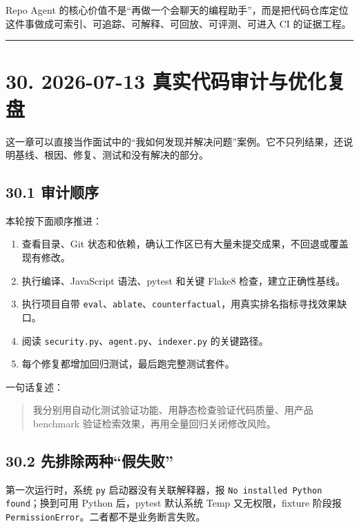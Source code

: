 \documentclass[UTF8,12pt,openany]{ctexbook}
\begin{document}
Repo Agent 的核心价值不是“再做一个会聊天的编程助手”，而是把代码仓库定位这件事做成可索引、可追踪、可解释、可回放、可评测、可进入 CI 的证据工程。\par

\hrule

\section{30. 2026-07-13 真实代码审计与优化复盘}

这一章可以直接当作面试中的“我如何发现并解决问题”案例。它不只列结果，还说明基线、根因、修复、测试和没有解决的部分。\par

\subsection{30.1 审计顺序}

本轮按下面顺序推进：\par

\begin{enumerate}
\item 查看目录、Git 状态和依赖，确认工作区已有大量未提交成果，不回退或覆盖现有修改。
\item 执行编译、JavaScript 语法、pytest 和关键 Flake8 检查，建立正确性基线。
\item 执行项目自带 \texttt{eval}、\texttt{ablate}、\texttt{counterfactual}，用真实排名指标寻找效果缺口。
\item 阅读 \texttt{security.py}、\texttt{agent.py}、\texttt{indexer.py} 的关键路径。
\item 每个修复都增加回归测试，最后跑完整测试套件。
\end{enumerate}

一句话复述：\par

\begin{quote}
我分别用自动化测试验证功能、用静态检查验证代码质量、用产品 benchmark 验证检索效果，再用全量回归关闭修改风险。
\end{quote}

\subsection{30.2 先排除两种“假失败”}

第一次运行时，系统 \texttt{py} 启动器没有关联解释器，报 \texttt{No installed Python found}；换到可用 Python 后，pytest 默认系统 Temp 又无权限，fixture 阶段报 \texttt{PermissionError}。二者都不是业务断言失败。\par
\end{document}
